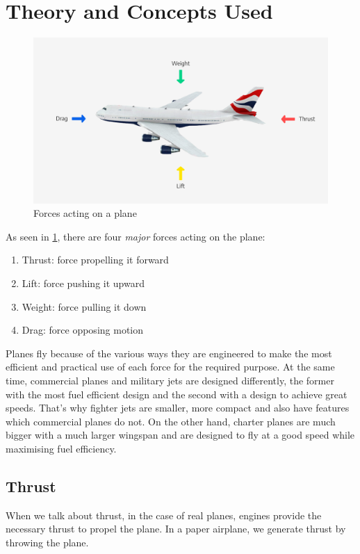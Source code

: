 \documentclass[12pt]{article}
\begin{document}
\section{Theory and Concepts Used}
\begin{figure}[h!]
	\begin{center}
		\includegraphics[scale=0.15]{plane1}
	\end{center}
	\caption{Forces acting on a plane}
	\label{fig:Plane Diagram}
\end{figure}
As seen in \ref{fig:Plane Diagram}, there are four \emph{major} forces acting on the plane:
\begin{enumerate}
	\item Thrust: force propelling it forward
	\item Lift: force pushing it upward
	\item Weight: force pulling it down
	\item Drag: force opposing motion
\end{enumerate}
Planes fly because of the various ways they are engineered to make the most efficient and practical use of each force for the required purpose.
At the same time, commercial planes and military jets are designed differently, the former with the most fuel efficient design and the second with a design to achieve great speeds. That's why fighter jets are smaller, more compact and also have features which commercial planes do not. On the other hand, charter planes are much bigger with a much larger wingspan and are designed to fly at a good speed while maximising fuel efficiency.

\subsection{Thrust}
When we talk about thrust, in the case of real planes, engines provide the necessary thrust to propel the plane. In a paper airplane, we generate thrust by throwing the plane.
\end{document}
